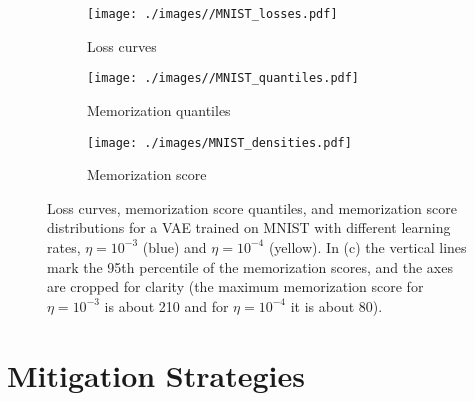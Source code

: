 \documentclass{article}
\begin{document}
\begin{figure}[tb]
	\centering
	\def\FigSizeMNIST{0.329\textwidth}
	\captionsetup[subfigure]{justification=centering}%
	\begin{subfigure}[b]{\FigSizeMNIST}
		\texttt{[image: ./images//MNIST\_losses.pdf]}
		\caption{Loss curves \label{fig:mnist_mem_lrs_loss}}
	\end{subfigure}
	\begin{subfigure}[b]{\FigSizeMNIST}
		\texttt{[image: ./images//MNIST\_quantiles.pdf]}
		\caption{Memorization quantiles 
			\label{fig:mnist_mem_lrs_quantiles}}
	\end{subfigure}
	\begin{subfigure}[b]{\FigSizeMNIST}
		\texttt{[image: ./images/MNIST\_densities.pdf]}
		\caption{Memorization score \label{fig:mnist_mem_lrs_mem}}
	\end{subfigure}
	\caption{Loss curves, memorization score quantiles, and memorization 
		score distributions for a VAE trained on MNIST with different 
		learning rates, $\eta = 10^{-3}$ (\textcolor{MyBlue}{blue}) 
		and $\eta = 10^{-4}$ (\textcolor{MyYellow}{yellow}). In (c) 
		the vertical lines mark the 95th percentile of the 
		memorization scores, and the axes are cropped for clarity (the 
		maximum memorization score for $\eta = 10^{-3}$ is about 210 
		and for $\eta = 10^{-4}$ it is about 80).  
		\label{fig:mnist_mem_lrs}}
\end{figure}

\section{Mitigation Strategies}
\label{sec:mitigation}
\end{document}
